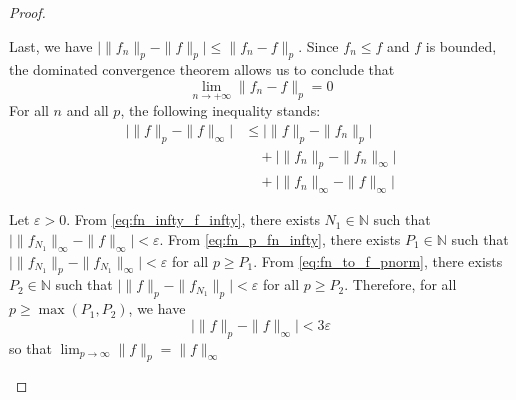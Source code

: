 \documentclass[11pt,a4paper,twoside]{article}
\theoremstyle{definition}
\begin{document}
\begin{proof}
\begin{enumerate}[(a)]
    Last, we have $\big| \| f_n \|_p - \| f \|_p \big| \leq \| f_n - f \|_p$. Since $f_n \leq f$ and $f$ is bounded, the dominated convergence theorem
    allows us to conclude that
    \begin{equation} \label{eq:fn_to_f_pnorm}
      \lim_{n \to +\infty} \| f_n - f \|_p = 0
    \end{equation}
    For all $n$ and all $p$, the following inequality stands:
    \begin{align*}
      \big| \| f \|_p - \| f \|_\infty \big| &\leq \big| \| f \|_p - \| f_n \|_p \big| \\
      &\quad + \big| \| f_n \|_p - \| f_n \|_\infty \big| \\
      &\quad + \big| \| f_n \|_\infty - \| f \|_\infty \big|
    \end{align*}

    Let $\varepsilon > 0$.
    From \eqref{eq:fn_infty_f_infty}, there exists $N_1 \in \mathbb{N}$ such that $\big| \| f_{N_1} \|_\infty - \| f \|_\infty \big| < \varepsilon$.
    From \eqref{eq:fn_p_fn_infty}, there exists $P_1 \in \mathbb{N}$ such that $\big| \| f_{N_1} \|_p - \| f_{N_1} \|_\infty \big| < \varepsilon$ for all $p \geq P_1$.
    From \eqref{eq:fn_to_f_pnorm}, there exists $P_2 \in \mathbb{N}$ such that $\big| \| f \|_p - \| f_{N_1} \|_p \big| < \varepsilon$ for all $p \geq P_2$.
    Therefore, for all $p \geq \max ( P_1, P_2 )$, we have
    \begin{equation*}
      \big| \| f \|_p - \| f \|_\infty \big| < 3 \varepsilon
    \end{equation*}
    so that $\lim_{p \to \infty} \| f \|_p = \| f \|_\infty$

  \end{enumerate}

\end{proof}
\end{document}
